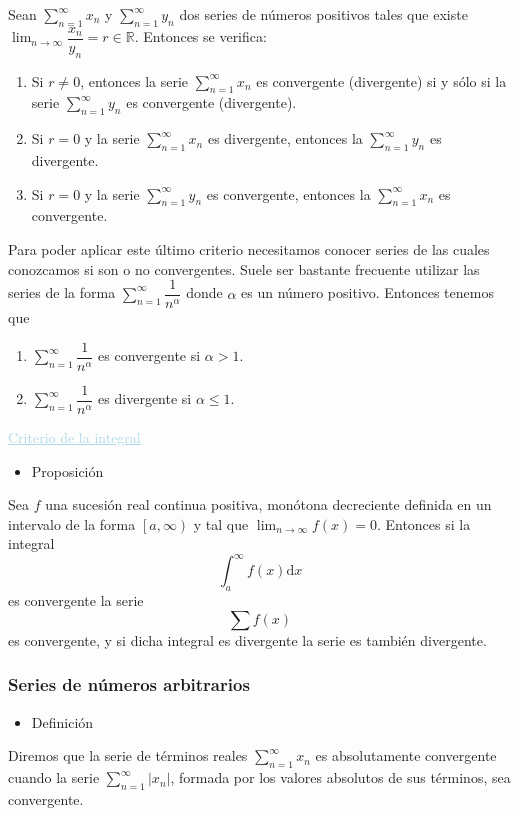 \documentclass[12pt]{article}
\begin{document}
Sean $\sum_{n=1}^{\infty}x_n$ y $\sum_{n=1}^{\infty}y_n$ dos series de números positivos tales que existe $\lim_{n\to\infty}\dfrac{x_n}{y_n}=r\in\mathbb{R}$. Entonces se verifica:
\begin{enumerate}[label=\arabic*)]
	\item Si $r\neq0$, entonces la  serie $\sum_{n=1}^{\infty}x_n$ es convergente (divergente) si y sólo si la serie $\sum_{n=1}^{\infty}y_n$ es convergente (divergente).
	\item Si $r=0$ y la serie $\sum_{n=1}^{\infty}x_n$ es divergente, entonces la $\sum_{n=1}^{\infty}y_n$ es divergente.
	\item Si $r=0$ y la serie $\sum_{n=1}^{\infty}y_n$ es convergente, entonces la $\sum_{n=1}^{\infty}x_n$ es convergente.
\end{enumerate}
Para poder aplicar este último criterio necesitamos conocer series de las cuales conozcamos si son o no convergentes. Suele ser bastante frecuente utilizar las series de la forma $\sum_{n=1}^{\infty}\dfrac{1}{n^\alpha}$ donde $\alpha$ es un número positivo. Entonces tenemos que 
\begin{enumerate}[label=\arabic*)]
	\item $\sum_{n=1}^{\infty}\dfrac{1}{n^\alpha}$ es convergente si $\alpha>1$.
	\item $\sum_{n=1}^{\infty}\dfrac{1}{n^\alpha}$ es divergente si $\alpha\le 1$.
\end{enumerate}
\textcolor{lightblue}{\underline{Criterio de la integral}}
\begin{itemize}[label=\color{red}\textbullet, leftmargin=*]
	\item \color{lightblue}Proposición
\end{itemize}
Sea $f$ una sucesión real continua positiva, monótona decreciente definida en un intervalo de la forma $\left[a,\infty\right)$ y tal que $\lim_{n\to\infty}f(x)=0$. Entonces si la integral \[ \int_{a}^{\infty} f(x)\mathrm{d}x\]es convergente la serie \[ \sum f(x) \] es convergente, y si dicha integral es divergente la serie es también divergente.
\subsubsection{Series de números arbitrarios}
\begin{itemize}[label=\color{red}\textbullet, leftmargin=*]
	\item \color{lightblue}Definición
\end{itemize}
Diremos que la serie de términos reales $\sum_{n=1}^{\infty}x_n$ es absolutamente convergente cuando la serie $\sum_{n=1}^{\infty}|x_n|$, formada por los valores absolutos de sus términos, sea convergente.
\end{document}
